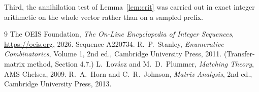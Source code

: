 \documentclass[11pt,a4paper]{article}
\theoremstyle{plain}
\theoremstyle{definition}
\begin{document}
Third, the annihilation test of Lemma~\ref{lem:crit} was carried out in exact integer
arithmetic on the whole vector rather than on a sampled prefix.

\begin{thebibliography}{9}
 The OEIS Foundation, \emph{The On-Line Encyclopedia of Integer
Sequences}, \url{https://oeis.org}, 2026. Sequence A220734.
 R.~P.~Stanley, \emph{Enumerative Combinatorics}, Volume 1, 2nd ed.,
Cambridge University Press, 2011. (Transfer-matrix method, Section 4.7.)
 L.~Lov\'asz and M.~D.~Plummer, \emph{Matching Theory}, AMS Chelsea,
2009.
 R.~A.~Horn and C.~R.~Johnson, \emph{Matrix Analysis}, 2nd ed., Cambridge
University Press, 2013.
\end{thebibliography}
\end{document}
